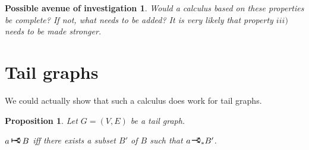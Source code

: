 \documentclass[11pt]{article}
\newcommand{\rightcurveor}{
\!
\mathrel{
  \begin{tikzpicture}[scale=0.8]
    \draw[thick,->] (0,0) arc (90:150:-2ex);
    \draw[thick,->] (0,0) arc (90:30:2ex);
    \draw[thick] (-1ex, 0) -- (0.1ex,0);
  \end{tikzpicture}
}\!
}
\newcommand{\Rightcurveor}{
\mathrel{
  \begin{tikzpicture}[scale=0.8]
    \draw[thick,->] (0,0) arc (90:150:-2ex);
    \draw[thick,->] (0,0) arc (90:30:2ex);
    \draw[thick] (-1ex, 0) -- (0.1ex,0);
    \draw[thick] (-1ex, -0.7ex) -- (-1ex, 0.7ex);
  \end{tikzpicture}
}
}
\newtheorem{prop}{Proposition}
\newtheorem*{av}{Possible avenue of investigation}
\begin{document}
\begin{av}
Would a calculus based on these properties be complete? If not, what needs to be added? It is very likely that property $iii)$ needs to be made stronger.
\end{av}

\section{Tail graphs}

We could actually show that such a calculus does work for tail graphs.

\begin{prop} \label{tailgraphndirectimplicationcharacterization}
Let $G = (V,E)$ be a tail graph.

$a \Rightcurveor B$ iff there exists a subset $B'$ of $B$ such that $a \rightcurveor_* B'$.
\end{prop}
\end{document}
